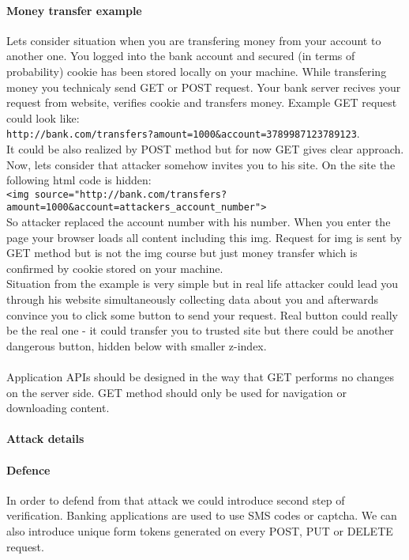 \documentclass{article}[12pt]
\begin{document}
\paragraph{Money transfer example} Lets consider situation when you are transfering money from your account to another one.
You logged into the bank account and secured (in terms of probability) cookie has been stored locally on your machine.
While transfering money you technicaly send GET or POST request.
Your bank server recives your request from website, verifies cookie and transfers money.
Example GET request could look like: \\
\texttt{http://bank.com/transfers?amount=1000\&account=3789987123789123}. \\
It could be also realized by POST method but for now GET gives clear approach.
Now, lets consider that attacker somehow invites you to his site.
On the site the following html code is hidden: \\
\texttt{<img source="http://bank.com/transfers?amount=1000\&account=attackers\_account\_number">}\\
So attacker replaced the account number with his number.
When you enter the page your browser loads all content including this img.
Request for img is sent by GET method but is not the img course but just money transfer which is confirmed by cookie stored on your machine.\\

Situation from the example is very simple but in real life attacker could lead you through his website simultaneously collecting data about you and afterwards convince you to click some button to send your request.
Real button could really be the real one - it could transfer you to trusted site but there could be another dangerous button, hidden below with smaller z-index. \\\\
Application APIs should be designed in the way that GET performs no changes on the server side.
GET method should only be used for navigation or downloading content.
\paragraph{Attack details}
\paragraph{Defence} In order to defend from that attack we could introduce second step of verification.
Banking applications are used to use SMS codes or captcha.
We can also introduce unique form tokens generated on every POST, PUT or DELETE request.
\end{document}
